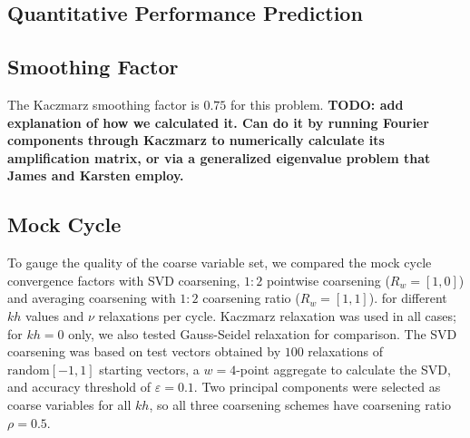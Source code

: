 \documentclass{article}
\begin{document}
\subsection{Quantitative Performance Prediction}

\subsection{Smoothing Factor}
The Kaczmarz smoothing factor is $0.75$ for this problem. {\bf TODO: add explanation of how we calculated it. Can do it by running Fourier components through Kaczmarz to numerically calculate its amplification matrix, or via a generalized eigenvalue problem that James and Karsten employ.}

\subsection{Mock Cycle}
\label{mock_cycle}
To gauge the quality of the coarse variable set, we compared the mock cycle convergence factors with SVD coarsening, $1:2$ pointwise coarsening ($R_w = [1, 0]$) and averaging coarsening with $1:2$ coarsening ratio ($R_w = [1, 1]$). for different $kh$ values and $\nu$ relaxations per cycle. Kaczmarz relaxation was used in all cases; for $kh=0$ only, we also tested Gauss-Seidel relaxation for comparison. The SVD coarsening was based on test vectors obtained by $100$ relaxations of $\text{random}[-1,1]$ starting vectors, a $w=4$-point aggregate to calculate the SVD, and accuracy threshold of  $\varepsilon=0.1$. Two principal components were selected as coarse variables for all $kh$, so all three coarsening schemes have coarsening ratio $\rho = 0.5$.
 
\end{document}
